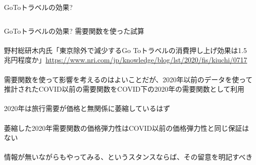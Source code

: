 \begin{frame}[t, label=GTTElasticity]{GoToトラベルの効果?}
\vspace{2ex}
\begin{columns}[T]
\column{.7\paperwidth}
\column{.25\paperwidth}
\begin{dinglist}{43}
\vspace{0.0ex}\setlength{\itemsep}{1.0ex}\setlength{\baselineskip}{12pt}
\end{dinglist}
\end{columns}
\end{frame}

\begin{frame}[t, label=GTTElasticity2]{GoToトラベルの効果?}
需要関数を使った試算\\~\\
野村総研木内氏「東京除外で減少するGo Toトラベルの消費押し上げ効果は1.5兆円程度か」{\scriptsize \url{https://www.nri.com/jp/knowledge/blog/lst/2020/fis/kiuchi/0717}}\\~\\

\pause
需要関数を使って影響を考えるのはよいことだが、2020年以前のデータを使って推計されたCOVID以前の需要関数をCOVID下の2020年の需要関数として利用\\~\\
\pause
2020年は旅行需要が価格と無関係に萎縮しているはず\\~\\
\pause
萎縮した2020年需要関数の価格弾力性はCOVID以前の価格弾力性と同じ保証はない\\~\\
\pause
情報が無いながらもやってみる、というスタンスならば、その留意を明記すべき
\end{frame}

